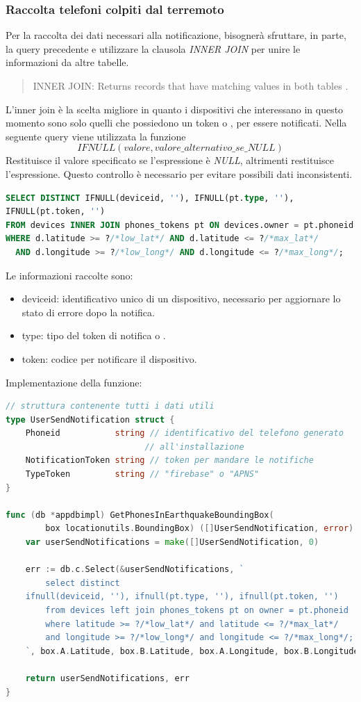 \documentclass[main.tex]{subfiles}
\begin{document}
\subsubsection{Raccolta telefoni colpiti dal terremoto}
Per la raccolta dei dati necessari alla notificazione, bisognerà sfruttare, in parte, la query precedente e utilizzare la clausola \emph{INNER JOIN} per unire le informazioni da altre tabelle. 
\begin{quote}
    INNER JOIN: Returns records that have matching values in both tables
\cite{LeftJoin}.
\end{quote}
L'inner join è la scelta migliore in quanto i dispositivi che interessano in questo momento sono solo quelli che possiedono un token  o , per essere notificati.\newline
Nella seguente query viene utilizzata la funzione \[IFNULL(valore, valore\_alternativo\_se\_NULL)\] 
Restituisce il valore specificato se l'espressione è \emph{NULL}, altrimenti restituisce l'espressione.
Questo controllo è necessario per evitare possibili dati inconsistenti.
\begin{lstlisting}[language=SQL]
SELECT DISTINCT IFNULL(deviceid, ''), IFNULL(pt.type, ''), 
IFNULL(pt.token, '')
FROM devices INNER JOIN phones_tokens pt ON devices.owner = pt.phoneid
WHERE d.latitude >= ?/*low_lat*/ AND d.latitude <= ?/*max_lat*/
  AND d.longitude >= ?/*low_long*/ AND d.longitude <= ?/*max_long*/;
\end{lstlisting}
Le informazioni raccolte sono:
\begin{itemize}
    \item deviceid: identificativo unico di un dispositivo, necessario per aggiornare lo stato di errore dopo la notifica.
    \item type: tipo del token di notifica  o .
    \item token: codice per notificare il dispositivo.
\end{itemize}
Implementazione della funzione:
\begin{lstlisting}[language=go]
// struttura contenente tutti i dati utili
type UserSendNotification struct {
	Phoneid           string // identificativo del telefono generato 
                            // all'installazione
	NotificationToken string // token per mandare le notifiche
	TypeToken         string // "firebase" o "APNS"
}

func (db *appdbimpl) GetPhonesInEarthquakeBoundingBox(
        box locationutils.BoundingBox) ([]UserSendNotification, error) {
	var userSendNotifications = make([]UserSendNotification, 0)

	err := db.c.Select(&userSendNotifications, `
		select distinct 
    ifnull(deviceid, ''), ifnull(pt.type, ''), ifnull(pt.token, '')
		from devices left join phones_tokens pt on owner = pt.phoneid
		where latitude >= ?/*low_lat*/ and latitude <= ?/*max_lat*/
		and longitude >= ?/*low_long*/ and longitude <= ?/*max_long*/;
	`, box.A.Latitude, box.B.Latitude, box.A.Longitude, box.B.Longitude)

	return userSendNotifications, err
}
\end{lstlisting}
\end{document}
